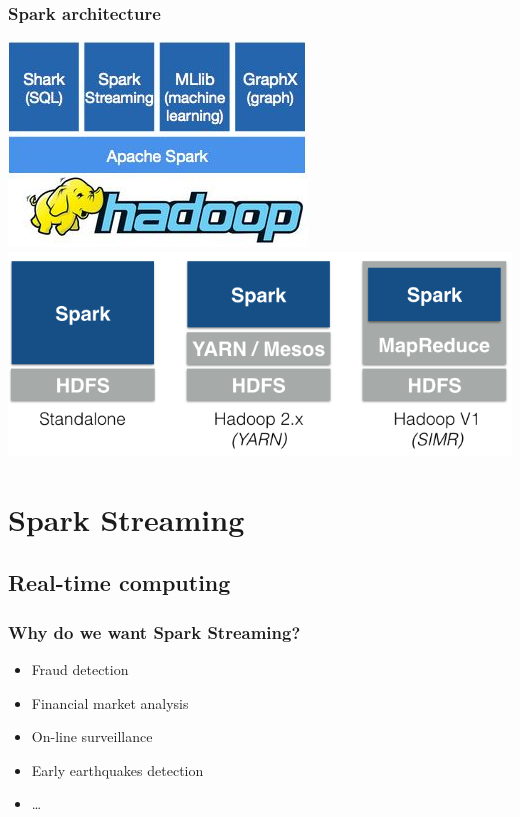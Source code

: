 \documentclass{beamer}
\begin{document}
\begin{frame}
\frametitle{Spark architecture}
\begin{center}
\includegraphics[height=0.4\textheight]{img/SparkHadoop.png}
\vspace{1em}
\includegraphics[height=0.4\textheight]{img/spark-on-hadoop.png}
\end{center}
\end{frame}

\section{Spark Streaming}

\subsection*{Real-time computing}
\begin{frame}
\frametitle{Why do we want Spark Streaming?}
	\begin{itemize}
		\item Fraud detection
		\item Financial market analysis
		\item On-line surveillance
		\item Early earthquakes detection
		\item \ldots
	\end{itemize}
\end{frame}
\end{document}

